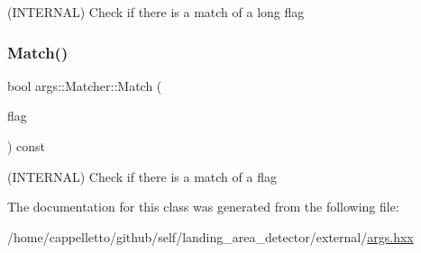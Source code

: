 (I\+N\+T\+E\+R\+N\+AL) Check if there is a match of a long flag \mbox{\label{classargs_1_1_matcher_ad657c9f5cca2892863c71bb980ea94e2}} 
\subsubsection{\texorpdfstring{Match()}{Match()}\hspace{0.1cm}{\footnotesize\ttfamily [3/3]}}
{\footnotesize\ttfamily bool args\+::\+Matcher\+::\+Match (\begin{DoxyParamCaption}\item[{const \hyperlink{structargs_1_1_either_flag}{Either\+Flag} \&}]{flag }\end{DoxyParamCaption}) const\hspace{0.3cm}{\ttfamily [inline]}}

(I\+N\+T\+E\+R\+N\+AL) Check if there is a match of a flag 

The documentation for this class was generated from the following file\+:\begin{DoxyCompactItemize}
\item 
/home/cappelletto/github/self/landing\+\_\+area\+\_\+detector/external/\hyperlink{args_8hxx}{args.\+hxx}\end{DoxyCompactItemize}

